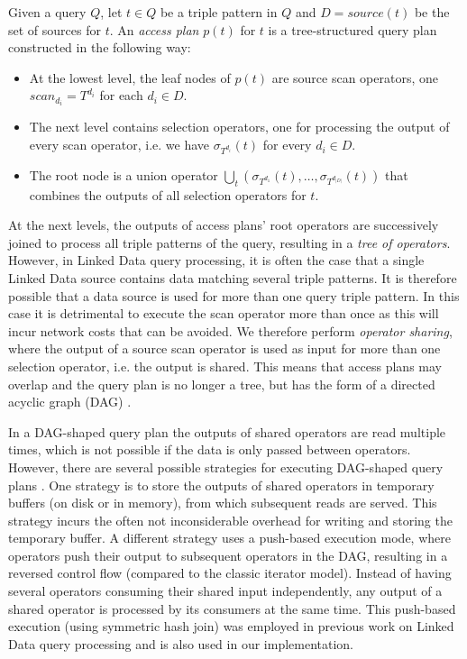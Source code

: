 \begin{definition}
  Given a query $Q$, let $t \in Q$ be a triple pattern in $Q$ and $D = source(t)$ be the set of sources for $t$. An \emph{access plan} $p(t)$ for $t$ is a tree-structured query plan constructed in the
  following way:
  \begin{itemize}
  \item At the lowest level, the leaf nodes of $p(t)$ are source scan operators, one
    $scan_{d_i} = T^{d_i}$ for each $d_i \in D$.
  \item The next level contains selection operators, one
    for processing the output of every scan operator, i.e. we have $\sigma_{T^{d_i}}(t)$ for every $d_i \in D$.     
   \item The root node is a union operator $\bigcup_t(\sigma_{T^{d_1}}(t),\ldots,\sigma_{T^{d_{|D|}}}(t))$ that combines the outputs of all selection operators for $t$.    
  \end{itemize}
\end{definition}

At the next levels, the outputs of access plans' root operators are
successively joined to process all triple patterns of the query,
resulting in a \emph{tree of operators}. However, in Linked Data query
processing, it is often the case that a single Linked Data source
contains data matching several triple patterns. It is therefore
possible that a data source is used for more than one query triple
pattern. In this case it is detrimental to execute the scan operator
more than once as this will incur network costs that can be
avoided. We therefore perform \emph{operator sharing}, where the
output of a source scan operator is used as input for more than one
selection operator, i.e. the output is shared. This means that access
plans may overlap and the query plan is no longer a tree, but
has the form of a directed acyclic graph (DAG) \cite{Neumann_2005}.

In a DAG-shaped query plan the outputs of shared operators are 
read multiple times, which is not possible if the data is only passed
between operators. However, there are several possible strategies for
executing DAG-shaped query plans \cite{Neumann_2005}. One strategy is
to store the outputs of shared operators in temporary buffers (on disk
or in memory), from which subsequent reads are served. This strategy
incurs the often not inconsiderable overhead for writing and storing
the temporary buffer. A different strategy uses a push-based execution
mode, where operators push their output to subsequent operators
in the DAG, resulting in a reversed control flow (compared
to the classic iterator model). Instead of having several
operators consuming their shared input independently, any output of a
shared operator is processed by its consumers at the same time. This
push-based execution (using symmetric hash join) was employed in previous work on Linked Data query processing
\cite{ladwig_linked_2010,sihjoin_2011} and is also used in our
implementation.

